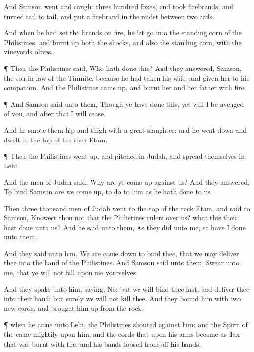{And
Samson
went and
caught
three
hundred
foxes, and
took
firebrands, and
turned
tail to
tail, and
put
a
firebrand in the
midst between
two
tails.

And when he had
set the
brands on
fire, he let
{}
go into the standing
corn of the
Philistines, and burnt
up both the
shocks, and also the standing
corn, with the
vineyards
{}
olives.


\par }{\PP {}¶ Then the
Philistines
said, Who hath
done this? And they
answered,
Samson, the son in
law of the
Timnite, because he had
taken his
wife, and
given her to his
companion. And the
Philistines came
up, and
burnt her and her
father with
fire.


\par }{\PP {}¶ And
Samson
said unto them,
Though ye have
done
this, yet will I be
avenged of you, and
after that I will
cease.

And he
smote them
hip
and
thigh with a
great
slaughter: and he went
down and
dwelt in the
top of the
rock
Etam.


\par }{\PP {}¶ Then the
Philistines went
up, and
pitched in
Judah, and
spread themselves in
Lehi.

And the
men of
Judah
said, Why are ye come
up against us? And they
answered, To
bind
Samson are we come
up, to
do to him as he hath
done to us.

Then
three
thousand
men of
Judah
went to the
top of the
rock
Etam, and
said to
Samson,
Knowest thou not that the
Philistines
{}
rulers over us? what
{} this
{} thou hast
done unto us? And he
said unto them, As they
did unto me, so have I
done unto them.

And they
said unto him, We are come
down to
bind thee, that we may
deliver thee into the
hand of the
Philistines. And
Samson
said unto them,
Swear unto me, that ye will not fall
upon me yourselves.

And they
spake unto him,
saying, No; but we will
bind thee
fast, and
deliver thee into their
hand: but
surely we will not
kill thee. And they
bound him with
two
new
cords, and brought him
up from the
rock.


\par }{\PP {}¶
{} when he
came unto
Lehi, the
Philistines
shouted
against him: and the
Spirit of the
{} came
mightily upon him, and the
cords that
{} upon his
arms became as
flax that was
burnt with
fire, and his
bands
loosed from off his
hands.

}
